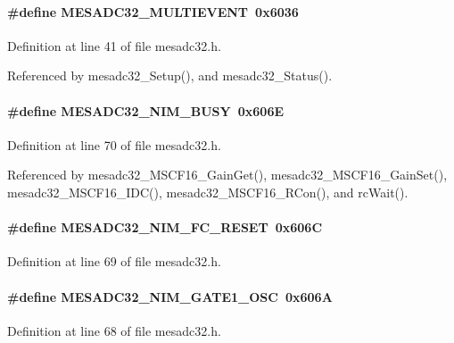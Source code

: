 \paragraph[{MESADC32\_\-MULTIEVENT}]{\setlength{\rightskip}{0pt plus 5cm}\#define MESADC32\_\-MULTIEVENT~0x6036}\hfill\label{mesadc32_8h_a63066f67b5625b09b9523a4fa38ef659}


Definition at line 41 of file mesadc32.h.

Referenced by mesadc32\_\-Setup(), and mesadc32\_\-Status().
\paragraph[{MESADC32\_\-NIM\_\-BUSY}]{\setlength{\rightskip}{0pt plus 5cm}\#define MESADC32\_\-NIM\_\-BUSY~0x606E}\hfill\label{mesadc32_8h_a4bbf45d695649d2efad90ca8858f29fb}


Definition at line 70 of file mesadc32.h.

Referenced by mesadc32\_\-MSCF16\_\-GainGet(), mesadc32\_\-MSCF16\_\-GainSet(), mesadc32\_\-MSCF16\_\-IDC(), mesadc32\_\-MSCF16\_\-RCon(), and rcWait().
\paragraph[{MESADC32\_\-NIM\_\-FC\_\-RESET}]{\setlength{\rightskip}{0pt plus 5cm}\#define MESADC32\_\-NIM\_\-FC\_\-RESET~0x606C}\hfill\label{mesadc32_8h_a74efd524fbca60860ae44788e173223a}


Definition at line 69 of file mesadc32.h.
\paragraph[{MESADC32\_\-NIM\_\-GATE1\_\-OSC}]{\setlength{\rightskip}{0pt plus 5cm}\#define MESADC32\_\-NIM\_\-GATE1\_\-OSC~0x606A}\hfill\label{mesadc32_8h_a52912d6934b959b4e8c0ac7de61c06ef}


Definition at line 68 of file mesadc32.h.
